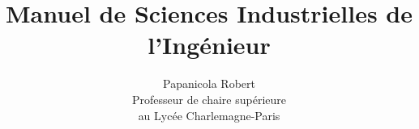 
\title{Manuel de Sciences Industrielles de l'Ingénieur}                                    %

\author{Papanicola Robert\\
Professeur de chaire supérieure \\
au  Lycée Charlemagne-Paris}                                   %
\date{}     

\usepackage{relsize}

\usepackage{lastpage}
\usepackage{nameref}
\usepackage[francais]{varioref}
\usepackage[plainpages=false,unicode,psdextra]{hyperref}

\usepackage{karnaugh-map}

%

\ifdim\paperheight<150mm%
\let\Acinqclearpage\clearpage
\let \Aquatreclearpage\relax \else%
\let\Acinqclearpage\relax
\let\Aquatreclearpage\clearpage \fi 




